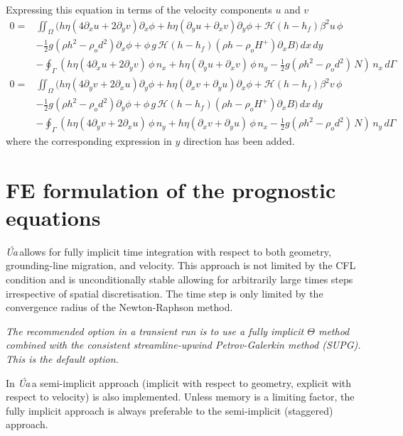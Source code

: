 \documentclass[10pt,a4paper]{book}
\newcommand{\He}{\mathcal{H}}
\newcommand{\p}{\partial}
\newcommand{\Ua}{\textsl{\'Ua}\,}
\begin{document}
Expressing this equation in terms of the velocity components $u$ and $v$
\begin{align} 
0=&\iint_{\Omega} (h \eta ( 4 \p_x u + 2 \p_y v ) \p_x\phi +  h \eta (\p_y u + \p_x v) \p_y\phi + \He(h-h_f) \beta^2 u \,\phi \nonumber \\
  &- \frac{1}{2} g (\rho h^2 - \rho_o d^2) \p_x\phi   +\phi \, g\,\He(h-h_f) (\rho h -\rho_o H^{+}) \p_x B ) \, dx \, dy \nonumber \\
  & - \oint_{\Gamma} (h \eta ( 4\p_x u + 2 \p_y v) \,\phi \, n_x+  h \eta (\p_y u + \p_x v) \,\phi \, n_y- \frac{1}{2} g (\rho h^2 - \rho_o d^2) \, N)\, n_x\, d\Gamma \label{eq:FEx2}\\
0=&\iint_{\Omega} (h \eta ( 4 \p_y v + 2 \p_x u ) \p_y\phi +  h \eta (\p_x v + \p_y u) \p_x\phi + \He(h-h_f) \beta^2 v \,\phi \nonumber
\\ &- \frac{1}{2} g (\rho h^2 - \rho_o d^2) \p_y\phi   +\phi \, g\,\He(h-h_f) (\rho h -\rho_o H^{+}) \p_x B ) \, dx \, dy \nonumber \\
  & - \oint_{\Gamma} (h \eta ( 4\p_y v + 2 \p_x u) \,\phi \, n_y+  h \eta (\p_x v + \p_y u) \,\phi \, n_x- \frac{1}{2} g (\rho h^2 - \rho_o d^2) \, N)\, n_y\, d\Gamma \label{eq:FEy2}
\end{align}
where the corresponding expression in $y$ direction has been added.


\section{FE formulation of the prognostic equations}



\Ua allows for fully implicit time integration with respect to both
geometry, grounding-line migration, and velocity. This approach is not
limited by the CFL condition and is unconditionally stable allowing
for arbitrarily large times steps irrespective of spatial
discretisation. The time step is only limited by the convergence
radius of the Newton-Raphson method.

\textit{The recommended option in a transient run is to use a fully implicit
$\Theta$ method combined with the consistent streamline-upwind
Petrov-Galerkin method (SUPG).  This is the default option.}



In \Ua a semi-implicit approach (implicit with respect to geometry,
explicit with respect to velocity) is also implemented. Unless memory
is a limiting factor, the fully implicit approach is always preferable
to the semi-implicit (staggered) approach. 
\end{document}
